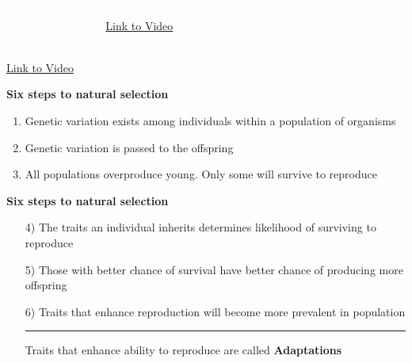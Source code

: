 \documentclass[t]{beamer}
\begin{document}
%

{
\begin{frame}[b,plain]
	\tiny \textcolor{white}{Marine iguana on San Crist\'{o}bal Island, Galapagos by Les Williams, Flickr, Creative Commons.}\hfill
	\textcolor{white}{\href{https://www.youtube.com/watch?v=4tBWakZAGqU}{Link to Video}}
\end{frame}
}

%

{
\begin{frame}[b,plain]
	\tiny\textcolor{white}{Greater Bird of Paradise \textcopyright Tim Laman, All Rights Reserved. Used with permission. \hfill\href{http://www.youtube.com/watch?v=KIYkpwyKEhY}{Link to Video} }
\end{frame}
}

%

\begin{frame}[t]{\LARGE \bfseries \hfill Six steps to natural selection \hfill}

\Large
\begin{enumerate}
\item Genetic variation exists among individuals within a population of organisms

\bigskip

\item Genetic variation is passed to the offspring

\bigskip

\item All populations overproduce young. Only some will survive to reproduce

\end{enumerate}
\end{frame}
%

\begin{frame}[t]{\LARGE \bfseries \hfill Six steps to natural selection \hfill}

\Large

\begin{enumerate}
\item[\color{black}4)] The traits an individual inherits determines likelihood of surviving to reproduce

\bigskip

\item[\color{black}5)] Those with better chance of survival have better chance of producing more offspring

\bigskip

\item[\color{black}6)] Traits that enhance reproduction will become more prevalent in population

\rule{\linewidth}{0.4pt}

\centering Traits that enhance ability to reproduce are called 
\textbf{Adaptations}

\end{enumerate}
\end{frame}
\end{document}
